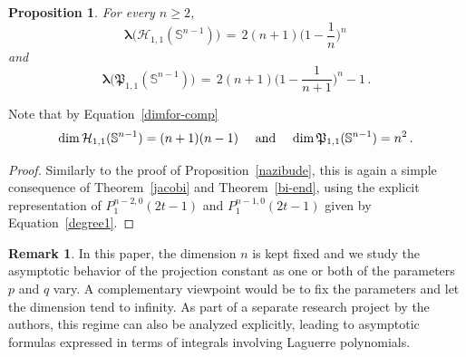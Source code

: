 \documentclass[12pt]{amsart}
\numberwithin{subsection}{section}
\newtheorem{problem}[theorem]{Problem}
\newtheorem{proposition}[theorem]{Proposition}
\theoremstyle{definition}
\newtheorem{remark}[theorem]{Remark}
\theoremstyle{remark}
\begin{document}
\begin{proposition}\label{caso 1-1}
  For every  $n \ge 2  $,
  \[
  \boldsymbol{\lambda}\big(\mathcal{H}_{1,1}(\mathbb{S}^{n-1})\big)
  \,= \,2 (n+1) \Big(1-\frac{1}{n}\Big)^n\,
  \]
  and
  \[
  \boldsymbol{\lambda}\big(\mathfrak{P}_{1,1}(\mathbb{S}^{n-1})\big)
  \,= \,2 (n+1) \Big(1-\frac{1}{n+1}\Big)^n -1\,.
  \]
\end{proposition}

Note that by Equation~\eqref{dimfor-comp}
\[
\text{
 $\dim \mathcal{H}_{1,1}(\mathbb{S}^{n-1}) = (n+1)(n-1) $
\quad and \quad
 $\dim \mathfrak{P}_{1,1}(\mathbb{S}^{n-1}) = n^2 $\,.
}
\]

\begin{proof}
  Similarly to the proof of Proposition~\ref{nazibude}, this is again a simple consequence of  Theorem~\ref{jacobi} and  Theorem~\ref{bi-end}, using the explicit representation of   $P_1^{n-2,0}(2t-1) $ and  $P_1^{n-1,0}(2t-1) $ given by Equation~\eqref{degree1}.
  \end{proof}


\begin{remark}
    In this paper, the dimension $n$ is kept fixed and we study the asymptotic behavior of the projection constant as one or both of the parameters $p$ and $q$ vary. A complementary viewpoint would be to fix the parameters and let the dimension tend to infinity. As part of a separate research project by the authors, this regime can also be analyzed explicitly, leading to asymptotic formulas expressed in terms of integrals involving Laguerre polynomials.
\end{remark}

\end{document}
